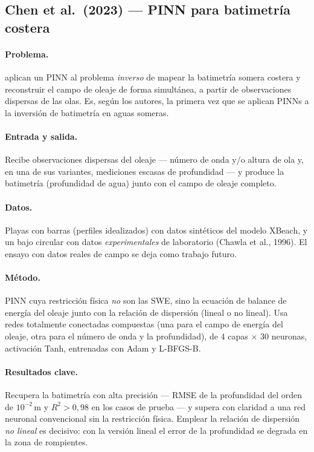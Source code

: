 \subsection{Chen et al.\ (2023) --- PINN para batimetría costera}
\label{sec:lit:chen}

\paragraph{Problema.}
\cite{chen2023} aplican un PINN al problema \emph{inverso} de mapear la
batimetría somera costera y reconstruir el campo de oleaje de forma simultánea,
a partir de observaciones dispersas de las olas. Es, según los autores, la
primera vez que se aplican PINNs a la inversión de batimetría en aguas someras.

\paragraph{Entrada y salida.}
Recibe observaciones dispersas del oleaje --- número de onda y/o altura de ola
y, en una de sus variantes, mediciones escasas de profundidad --- y produce la
batimetría (profundidad de agua) junto con el campo de oleaje completo.

\paragraph{Datos.}
Playas con barras (perfiles idealizados) con datos sintéticos del modelo XBeach,
y un bajo circular con datos \emph{experimentales} de laboratorio (Chawla
et al., 1996). El ensayo con datos reales de campo se deja como trabajo futuro.

\paragraph{Método.}
PINN cuya restricción física \emph{no} son las SWE, sino la ecuación de balance
de energía del oleaje junto con la relación de dispersión (lineal o no lineal).
Usa redes totalmente conectadas compuestas (una para el campo de energía del
oleaje, otra para el número de onda y la profundidad), de 4 capas $\times$ 30
neuronas, activación Tanh, entrenadas con Adam y L-BFGS-B.

\paragraph{Resultados clave.}
Recupera la batimetría con alta precisión --- RMSE de la profundidad del orden
de $10^{-2}$\,m y $R^2 > 0{,}98$ en los casos de prueba --- y supera con claridad
a una red neuronal convencional sin la restricción física. Emplear la relación
de dispersión \emph{no lineal} es decisivo: con la versión lineal el error de la
profundidad se degrada en la zona de rompientes.

